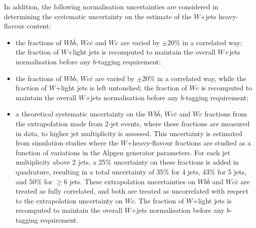 
In addition, the following normalisation uncertainties are considered in
determining the systematic uncertainty on the estimate of the $W$+jets
heavy-flavour content:
\begin{itemize}
\item the fractions of $Wb\bar{b}$, $Wc\bar{c}$ and $Wc$ are varied by $\pm 20\%$ 
in a correlated way; the fraction of $W$+light jets is recomputed to
maintain the overall  $W$+jets normalisation before any $b$-tagging requirement;
\item  the fractions of $Wb\bar{b}$, $Wc\bar{c}$ are varied by $\pm 20\%$ 
in a correlated way, while the fraction of $W$+light jets is left untouched; the
fraction of $Wc$ is recomputed to maintain the overall  $W$+jets normalisation before any $b$-tagging requirement;
\item a theoretical systematic uncertainty on the $Wb\bar{b}$, $Wc\bar{c}$  and $Wc$ fractions
from the extrapolation made from 2-jet events, where these fractions are measured in data, 
to higher jet multiplicity is assessed. This uncertainty is estimated from simulation studies where
the $W$+heavy-flavour fractions are studied as a function of variations in the {\sc Alpgen} generator parameters.
For each jet multiplicity above 2 jets, a 25\% uncertainty
on these fractions is added in quadrature, resulting in a total uncertainty of 35\% for 4 jets, 43\% for 5 jets,
and 50\% for $\geq 6$ jets. 
These extrapolation uncertainties on $Wb\bar{b}$ and $Wc\bar{c}$ are
treated as fully correlated, and both are treated as uncorrelated with respect to
the extrapolation uncertainty on $Wc$.
The fraction of $W$+light jets is recomputed to
maintain the overall  $W$+jets normalisation  before any $b$-tagging requirement.
\end{itemize}
